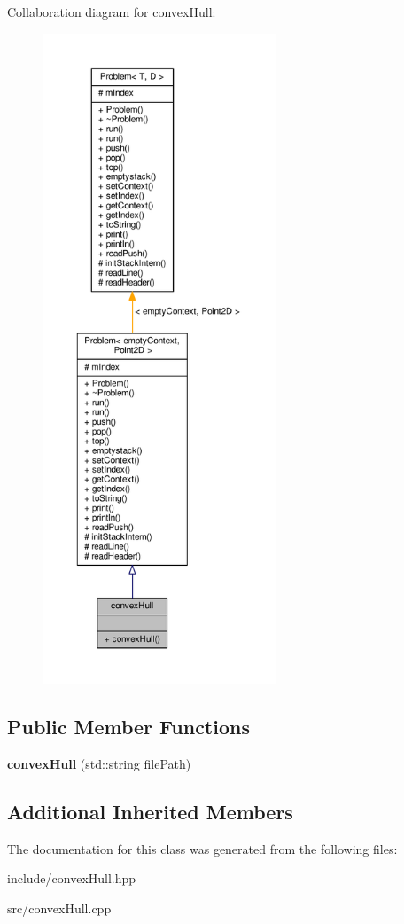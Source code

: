 Collaboration diagram for convex\+Hull\+:
\nopagebreak
\begin{figure}[H]
\begin{center}
\leavevmode
\includegraphics[height=550pt]{classconvex_hull__coll__graph}
\end{center}
\end{figure}
\subsection*{Public Member Functions}
\begin{DoxyCompactItemize}
\item 
{\bfseries convex\+Hull} (std\+::string file\+Path)\hypertarget{classconvex_hull_a36e1e32ed7c3c3b183cd2ea2d35b16b1}{}\label{classconvex_hull_a36e1e32ed7c3c3b183cd2ea2d35b16b1}

\end{DoxyCompactItemize}
\subsection*{Additional Inherited Members}


The documentation for this class was generated from the following files\+:\begin{DoxyCompactItemize}
\item 
include/convex\+Hull.\+hpp\item 
src/convex\+Hull.\+cpp\end{DoxyCompactItemize}
